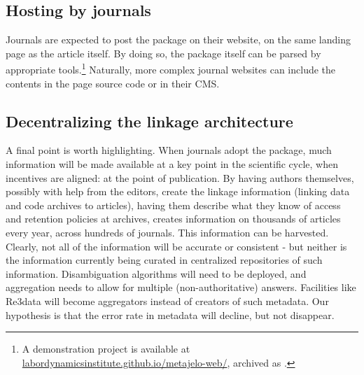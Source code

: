\subsection{Hosting by journals}
Journals are expected to post the package on their website, on the same landing page as the article itself. By doing so, the package itself can be parsed by appropriate tools.\footnote{A demonstration project is available at \href{https://labordynamicsinstitute.github.io/metajelo-web/}{labordynamicsinstitute.github.io/metajelo-web/}, archived as \citet{brandon_elam_barker_2021_4507862}.}  Naturally, more complex journal websites can include the contents in the page source code or in their \ac{CMS}. 

\subsection{Decentralizing the linkage architecture}
A final point is worth highlighting. When journals adopt the \metajelo package,  much information will be made available at a key point in the scientific cycle, when incentives are aligned: at the point of publication. By having authors themselves, possibly with help from the editors, create the linkage information (linking data and code archives to articles), having them describe what they know of access and retention policies at archives, creates information on thousands of articles every year, across hundreds of journals. This information can be harvested. Clearly, not all of the information will be accurate or consistent - but neither is the information currently being curated in centralized repositories of such information. Disambiguation algorithms will need to be deployed, and aggregation needs to allow for multiple (non-authoritative) answers. Facilities like Re3data will become aggregators instead of creators of such metadata. Our hypothesis is that the error rate in metadata will decline, but not disappear. 